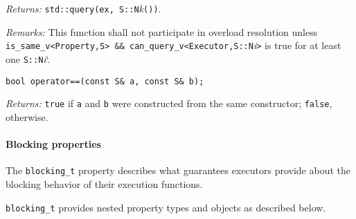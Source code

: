 \documentclass[a4paper,12pt,notitlepage,twoside,openright]{article}
\begin{document}
\emph{Returns:}
\texttt{std::query(ex, S::N}\emph{k}\texttt{())}.

\emph{Remarks:} This function shall not participate in overload
resolution unless
\texttt{is_same_v<Property,S> && can_query_v<Executor,S::N}\emph{i}\texttt{>}
is true for at least one \texttt{S::N}\emph{i}`.

\begin{verbatim}
bool operator==(const S& a, const S& b);
\end{verbatim}

\emph{Returns:} \texttt{true} if \texttt{a} and
\texttt{b} were constructed from the same constructor;
\texttt{false}, otherwise.

\hypertarget{blocking-properties}{%
\paragraph{Blocking properties}\label{blocking-properties}}

The \texttt{blocking_t} property describes what guarantees
executors provide about the blocking behavior of their execution
functions.

\texttt{blocking_t} provides nested property types and
objects as described below.
\end{document}
